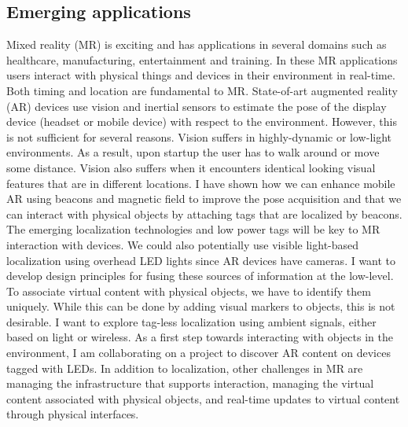 \documentclass[10pt]{article}
\begin{document}
\subsection{Emerging applications}
Mixed reality (MR) is exciting and has applications in several domains such as healthcare, manufacturing, entertainment and training. In these MR applications users interact with physical things and devices in their environment in real-time. %
Both timing and location are fundamental to MR. State-of-art augmented reality (AR) devices use vision and inertial sensors to estimate the pose of the display device (headset or mobile device) with respect to the environment. However, this is not sufficient for several reasons. Vision suffers in highly-dynamic or low-light environments. As a result, upon startup the user has to walk around or move some distance. Vision also suffers when it encounters identical looking visual features that are in different locations. I have shown how we can enhance mobile AR using beacons and magnetic field to improve the pose acquisition \cite{} and that we can interact with physical objects by attaching tags that are localized by beacons. The emerging localization technologies and low power tags will be key to MR interaction with devices. We could also potentially use visible light-based localization using overhead LED lights since AR devices have cameras. I want to develop design principles for fusing these sources of information at the low-level. To associate virtual content with physical objects, we have to identify them uniquely. While this can be done by adding visual markers to objects, this is not desirable. I want to explore tag-less localization using ambient signals, either based on light or wireless. As a first step towards interacting with objects in the environment, I am collaborating on a project to discover AR content on devices tagged with LEDs. In addition to localization, other challenges in MR are managing the infrastructure that supports interaction, managing the virtual content associated with physical objects, and real-time updates to virtual content through physical interfaces.
\end{document}

